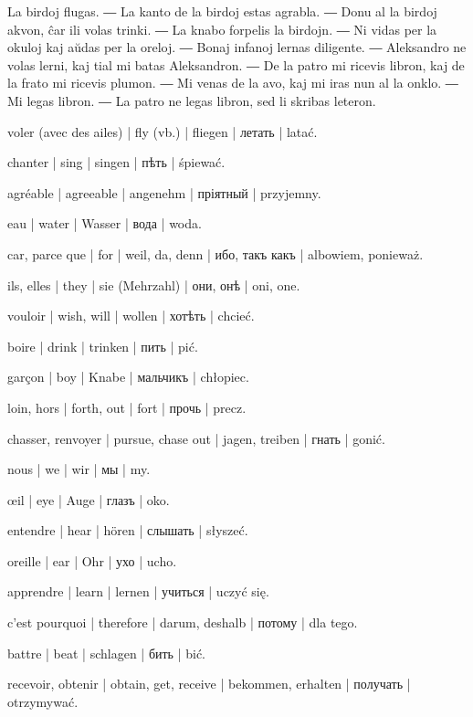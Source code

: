 

La birdoj flugas. ― La kanto de la birdoj estas agrabla. ― Donu al la birdoj akvon, ĉar ili volas trinki. ― La knabo forpelis la birdojn. ― Ni vidas per la okuloj kaj aŭdas per la oreloj. ― Bonaj infanoj lernas diligente. ― Aleksandro ne volas lerni, kaj tial mi batas Aleksandron. ― De la patro mi ricevis libron, kaj de la frato mi ricevis plumon. ― Mi venas de la avo, kaj mi iras nun al la onklo. ― Mi legas libron. ― La patro ne legas libron, sed li skribas leteron.

\begin{ekzvocab}{1em}
 voler (avec des ailes) | fly (vb.) | fliegen | летать | latać.

 chanter | sing | singen | пѣть | śpiewać.

 agréable | agreeable | angenehm | пріятный | przyjemny.

 eau | water | Wasser | вода | woda.

 car, parce que | for | weil, da, denn | ибо, такъ какъ | albowiem, ponieważ.

 ils, elles | they | sie (Mehrzahl) | они, онѣ | oni, one.

 vouloir | wish, will | wollen | хотѣть | chcieć.

 boire | drink | trinken | пить | pić.

 garçon | boy | Knabe | мальчикъ | chłopiec.

 loin, hors | forth, out | fort | прочь | precz.

 chasser, renvoyer | pursue, chase out | jagen, treiben | гнать | gonić.

 nous | we | wir | мы | my.

 œil | eye | Auge | глазъ | oko.

 entendre | hear | hören | слышать | słyszeć.

 oreille | ear | Ohr | ухо | ucho.

 apprendre | learn | lernen | учиться | uczyć się.

 c’est pourquoi | therefore | darum, deshalb | потому | dla tego.

 battre | beat | schlagen | бить | bić.

 recevoir, obtenir | obtain, get, receive | bekommen, erhalten | получать | otrzymywać.


\end{ekzvocab}
